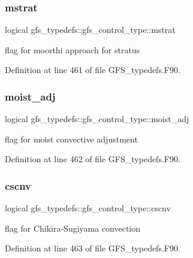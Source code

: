 \subsubsection{mstrat}
{\footnotesize\ttfamily logical gfs\+\_\+typedefs\+::gfs\+\_\+control\+\_\+type\+::mstrat}



flag for moorthi approach for stratus 



Definition at line 461 of file G\+F\+S\+\_\+typedefs.\+F90.

\mbox{\label{structgfs__typedefs_1_1gfs__control__type_aed21e6e11169a3ed0dc811d96525794b}} 
\subsubsection{moist\+\_\+adj}
{\footnotesize\ttfamily logical gfs\+\_\+typedefs\+::gfs\+\_\+control\+\_\+type\+::moist\+\_\+adj}



flag for moist convective adjustment 



Definition at line 462 of file G\+F\+S\+\_\+typedefs.\+F90.

\mbox{\label{structgfs__typedefs_1_1gfs__control__type_a2d326c9f89300e62c459a65358a0fedf}} 
\subsubsection{cscnv}
{\footnotesize\ttfamily logical gfs\+\_\+typedefs\+::gfs\+\_\+control\+\_\+type\+::cscnv}



flag for Chikira-\/\+Sugiyama convection 



Definition at line 463 of file G\+F\+S\+\_\+typedefs.\+F90.

\mbox{\label{structgfs__typedefs_1_1gfs__control__type_a235b970ea7a5c8589d479bc001cb1b72}} 
